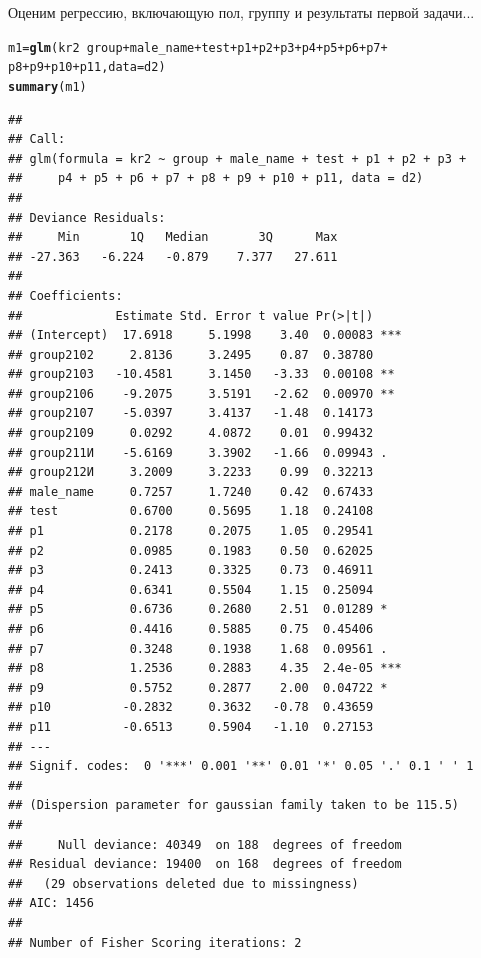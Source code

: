 \documentclass[pdftex,12pt,a4paper]{article}\usepackage{graphicx, color}
\makeatletter
\newcommand{\hlfunctioncall}[1]{\textcolor[rgb]{0.501960784313725,0,0.329411764705882}{\textbf{#1}}}%
\newenvironment{kframe}{%
 \def\at@end@of@kframe{}%
 \ifinner\ifhmode%
  \def\at@end@of@kframe{\end{minipage}}%
  \begin{minipage}{\columnwidth}%
 \fi\fi%
 \def\FrameCommand##1{\hskip\@totalleftmargin \hskip-\fboxsep
 \colorbox{shadecolor}{##1}\hskip-\fboxsep
     \hskip-\linewidth \hskip-\@totalleftmargin \hskip\columnwidth}%
 \MakeFramed {\advance\hsize-\width
   \@totalleftmargin\z@ \linewidth\hsize
   \@setminipage}}%
 {\par\unskip\endMakeFramed%
 \at@end@of@kframe}
\newenvironment{knitrout}{}{} %
\makeatother
\begin{document}

Оценим регрессию, включающую пол, группу и результаты первой задачи...

\begin{knitrout}
\color{fgcolor}\begin{kframe}
\begin{alltt}
m1 = \hlfunctioncall{glm}(kr2 ~ group + male_name + test + p1 + p2 + p3 + p4 + p5 + p6 + p7 + 
    p8 + p9 + p10 + p11, data = d2)
\hlfunctioncall{summary}(m1)
\end{alltt}
\begin{verbatim}
## 
## Call:
## glm(formula = kr2 ~ group + male_name + test + p1 + p2 + p3 + 
##     p4 + p5 + p6 + p7 + p8 + p9 + p10 + p11, data = d2)
## 
## Deviance Residuals: 
##     Min       1Q   Median       3Q      Max  
## -27.363   -6.224   -0.879    7.377   27.611  
## 
## Coefficients:
##             Estimate Std. Error t value Pr(>|t|)    
## (Intercept)  17.6918     5.1998    3.40  0.00083 ***
## group2102     2.8136     3.2495    0.87  0.38780    
## group2103   -10.4581     3.1450   -3.33  0.00108 ** 
## group2106    -9.2075     3.5191   -2.62  0.00970 ** 
## group2107    -5.0397     3.4137   -1.48  0.14173    
## group2109     0.0292     4.0872    0.01  0.99432    
## group211И    -5.6169     3.3902   -1.66  0.09943 .  
## group212И     3.2009     3.2233    0.99  0.32213    
## male_name     0.7257     1.7240    0.42  0.67433    
## test          0.6700     0.5695    1.18  0.24108    
## p1            0.2178     0.2075    1.05  0.29541    
## p2            0.0985     0.1983    0.50  0.62025    
## p3            0.2413     0.3325    0.73  0.46911    
## p4            0.6341     0.5504    1.15  0.25094    
## p5            0.6736     0.2680    2.51  0.01289 *  
## p6            0.4416     0.5885    0.75  0.45406    
## p7            0.3248     0.1938    1.68  0.09561 .  
## p8            1.2536     0.2883    4.35  2.4e-05 ***
## p9            0.5752     0.2877    2.00  0.04722 *  
## p10          -0.2832     0.3632   -0.78  0.43659    
## p11          -0.6513     0.5904   -1.10  0.27153    
## ---
## Signif. codes:  0 '***' 0.001 '**' 0.01 '*' 0.05 '.' 0.1 ' ' 1 
## 
## (Dispersion parameter for gaussian family taken to be 115.5)
## 
##     Null deviance: 40349  on 188  degrees of freedom
## Residual deviance: 19400  on 168  degrees of freedom
##   (29 observations deleted due to missingness)
## AIC: 1456
## 
## Number of Fisher Scoring iterations: 2
\end{verbatim}
\end{kframe}
\end{knitrout}
\end{document}
